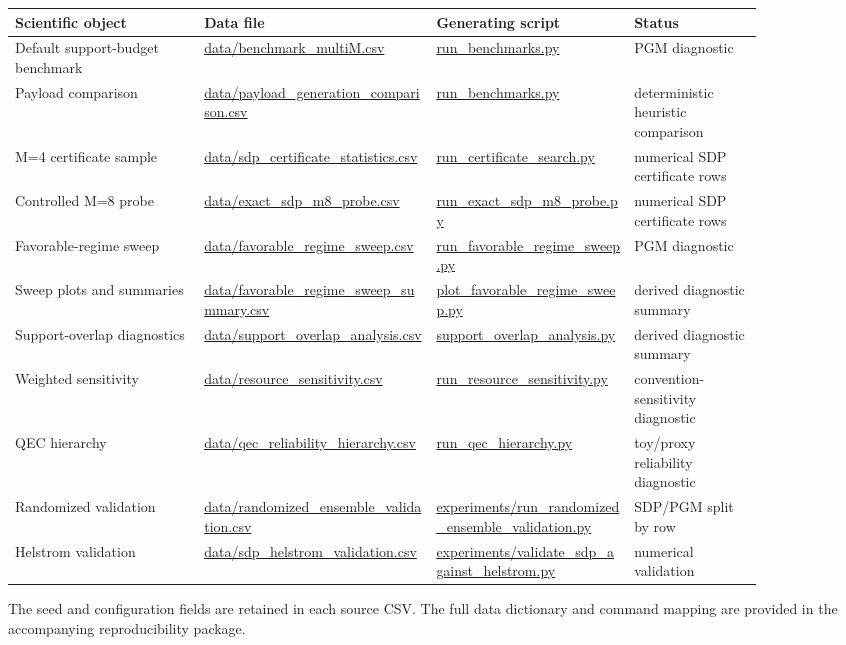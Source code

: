 \begin{center}\small
\begin{tabular}{p{0.22\linewidth}p{0.27\linewidth}p{0.23\linewidth}p{0.15\linewidth}}
\toprule
Scientific object & Data file & Generating script & Status\\
\midrule
Default support-budget benchmark & \url{data/benchmark_multiM.csv} & \url{run_benchmarks.py} & PGM diagnostic\\
Payload comparison & \url{data/payload_generation_comparison.csv} & \url{run_benchmarks.py} & deterministic heuristic comparison\\
M=4 certificate sample & \url{data/sdp_certificate_statistics.csv} & \url{run_certificate_search.py} & numerical SDP certificate rows\\
Controlled M=8 probe & \url{data/exact_sdp_m8_probe.csv} & \url{run_exact_sdp_m8_probe.py} & numerical SDP certificate rows\\
Favorable-regime sweep & \url{data/favorable_regime_sweep.csv} & \url{run_favorable_regime_sweep.py} & PGM diagnostic\\
Sweep plots and summaries & \url{data/favorable_regime_sweep_summary.csv} & \url{plot_favorable_regime_sweep.py} & derived diagnostic summary\\
Support-overlap diagnostics & \url{data/support_overlap_analysis.csv} & \url{support_overlap_analysis.py} & derived diagnostic summary\\
Weighted sensitivity & \url{data/resource_sensitivity.csv} & \url{run_resource_sensitivity.py} & convention-sensitivity diagnostic\\
QEC hierarchy & \url{data/qec_reliability_hierarchy.csv} & \url{run_qec_hierarchy.py} & toy/proxy reliability diagnostic\\
Randomized validation & \url{data/randomized_ensemble_validation.csv} & \url{experiments/run_randomized_ensemble_validation.py} & SDP/PGM split by row\\
Helstrom validation & \url{data/sdp_helstrom_validation.csv} & \url{experiments/validate_sdp_against_helstrom.py} & numerical validation\\
\bottomrule
\end{tabular}
\end{center}
The seed and configuration fields are retained in each source CSV. The full data dictionary and command mapping are provided in the accompanying reproducibility package.

